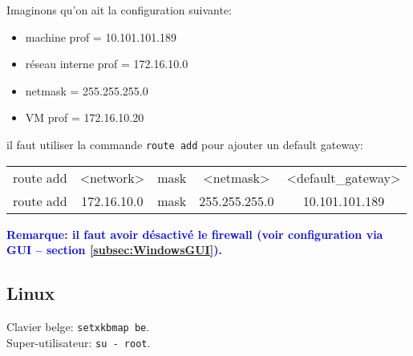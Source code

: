 \documentclass[a4paper]{article}
\renewcommand{\tt}{\texttt}
\begin{document}
\begin{itemize}
\begin{center}
\end{center}

Imaginons qu'on ait la configuration suivante:
\begin{itemize}
    \item machine prof = 10.101.101.189
    \item réseau interne prof = 172.16.10.0
    \item netmask = 255.255.255.0
    \item VM prof = 172.16.10.20
\end{itemize}
il faut utiliser la commande \texttt{route add} pour ajouter un default gateway:
\begin{center} \begin{tabular}{ccccc}
route add & <network> & mask & <netmask> & <default\_gateway> \\
route add & 172.16.10.0 & mask & 255.255.255.0 & 10.101.101.189
\end{tabular} \end{center}

\begin{center}
\textcolor{blue}{\textbf{Remarque: il faut avoir désactivé le firewall (voir configuration via GUI -- section \ref{subsec:WindowsGUI}).}}
\end{center}

\end{itemize}










\subsection{Linux} \label{subsec:LinuxCLI}





\begin{example}
    Clavier belge: \tt{setxkbmap be}. \\
    Super-utilisateur: \tt{su - root}.
\end{example}
\end{document}
